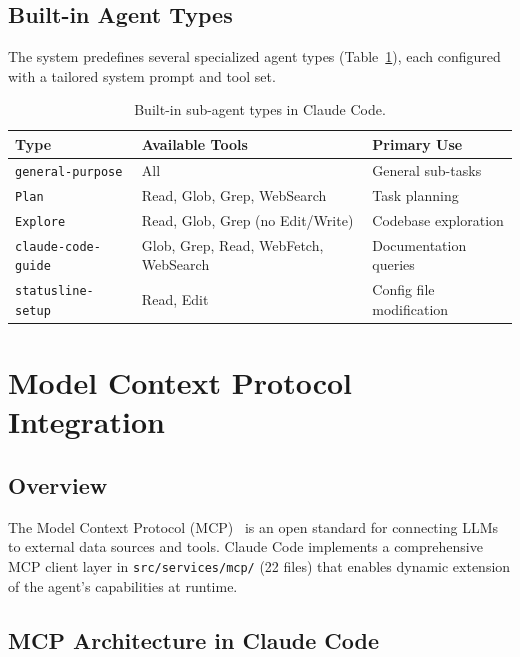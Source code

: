 \documentclass{article}
\begin{document}
\subsection{Built-in Agent Types}

The system predefines several specialized agent types (Table~\ref{tab:agent-types}), each configured with a tailored system prompt and tool set.

\begin{table}[t]
\centering
\caption{Built-in sub-agent types in Claude Code.}
\label{tab:agent-types}
\small
\begin{tabular}{lll}
\toprule
\textbf{Type} & \textbf{Available Tools} & \textbf{Primary Use} \\
\midrule
\texttt{general-purpose} & All & General sub-tasks \\
\texttt{Plan} & Read, Glob, Grep, WebSearch & Task planning \\
\texttt{Explore} & Read, Glob, Grep (no Edit/Write) & Codebase exploration \\
\texttt{claude-code-guide} & Glob, Grep, Read, WebFetch, WebSearch & Documentation queries \\
\texttt{statusline-setup} & Read, Edit & Config file modification \\
\bottomrule
\end{tabular}
\end{table}

\section{Model Context Protocol Integration}

\subsection{Overview}

The Model Context Protocol (MCP)~\cite{anthropic2024mcp} is an open standard for connecting LLMs to external data sources and tools. Claude Code implements a comprehensive MCP client layer in \texttt{src/services/mcp/} (22 files) that enables dynamic extension of the agent's capabilities at runtime.

\subsection{MCP Architecture in Claude Code}
\end{document}

